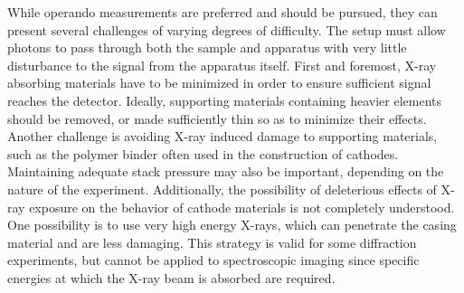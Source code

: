 \documentclass[journal=cmatex,manuscript=perspective]{achemso}
\begin{document}
While operando measurements are preferred and should be pursued, they
can present several challenges of varying degrees of difficulty. The
setup must allow photons to pass through both the sample and apparatus
with very little disturbance to the signal from the apparatus
itself. First and foremost, X-ray absorbing materials have to be
minimized in order to ensure sufficient signal reaches the
detector. Ideally, supporting materials containing heavier elements
should be removed, or made sufficiently thin so as to minimize their
effects. Another challenge is avoiding X-ray induced damage to
supporting materials, such as the polymer binder often used in the
construction of cathodes. Maintaining adequate stack pressure may also
be important, depending on the nature of the
experiment\cite{borkiewicz2015}. Additionally, the possibility of
deleterious effects of X-ray exposure on the behavior of cathode
materials is not completely understood. One possibility is to use very
high energy X-rays, which can penetrate the casing
material\cite{lin2013} and are less damaging. This strategy is valid
for some diffraction experiments, but cannot be applied to
spectroscopic imaging since specific energies at which the X-ray beam
is absorbed are required.
\end{document}
